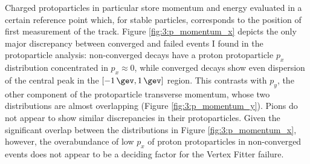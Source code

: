 Charged protoparticles in particular store momentum and energy evaluated in a certain reference point which, for stable particles, corresponds to the position of first measurement of the track.
Figure \ref{fig:3:p_momentum_x} depicts the only major discrepancy between converged and failed events I found in the protoparticle analysis:
non-converged \lbz decays have a proton protoparticle $p_x$ distribution concentrated in $p_x \approx 0$, while converged decays show even dispersion of the central peak in the $[-\SI{1}{\gev},\SI{1}{\gev}]$ region.
This contrasts with $p_y$, the other component of the protoparticle transverse momentum, whose two distributions are almost overlapping (Figure \ref{fig:3:p_momentum_y}).
Pions do not appear to show similar discrepancies in their protoparticles.
Given the significant overlap between the distributions in Figure \ref{fig:3:p_momentum_x}, however, the overabundance of low $p_x$ of proton protoparticles in non-converged events does not appear to be a deciding factor for the Vertex Fitter failure.


%
%
%
%
%
%
%

